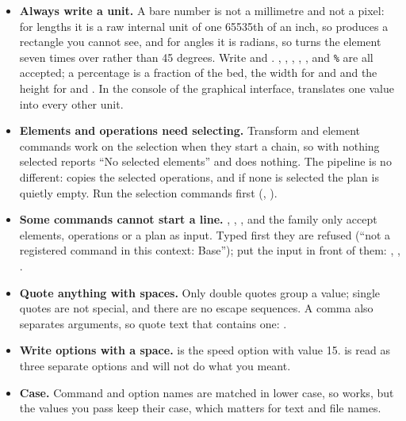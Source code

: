 \begin{itemize}[leftmargin=1.4em]
  \item \textbf{Always write a unit.} A bare number is not a millimetre and not a
        pixel: for lengths it is a raw internal unit of one 65535th of an inch, so
         produces a rectangle you cannot see, and for angles
        it is radians, so  turns the element seven times over
        rather than 45 degrees. Write  and
        . , , , , ,
         and \texttt{\%} are all accepted; a percentage is a fraction of the
        bed, the width for  and  and the height for  and
        . In the console of the graphical interface, 
        translates one value into every other unit.
  \item \textbf{Elements and operations need selecting.} Transform and
        element commands work on the selection when they start a chain, so
         with nothing selected reports ``No selected elements'' and
        does nothing. The pipeline is no different: 
        copies the selected operations, and if none is selected the plan is
        quietly empty. Run the selection commands first
        (, ).
  \item \textbf{Some commands cannot start a line.} , ,
        ,  and the  family only accept
        elements, operations or a plan as input. Typed first they are refused
        (``not a registered command in this context: Base''); put the input in
        front of them: , ,
        .
  \item \textbf{Quote anything with spaces.} Only double quotes group a value;
        single quotes are not special, and there are no escape sequences. A comma
        also separates arguments, so quote text that contains one:
        .
  \item \textbf{Write options with a space.}  is the speed option with
        value 15.  is read as three separate options and will not do
        what you meant.
  \item \textbf{Case.} Command and option names are matched in lower case, so
         works, but the values you pass keep their case, which matters
        for text and file names.

\end{itemize}
